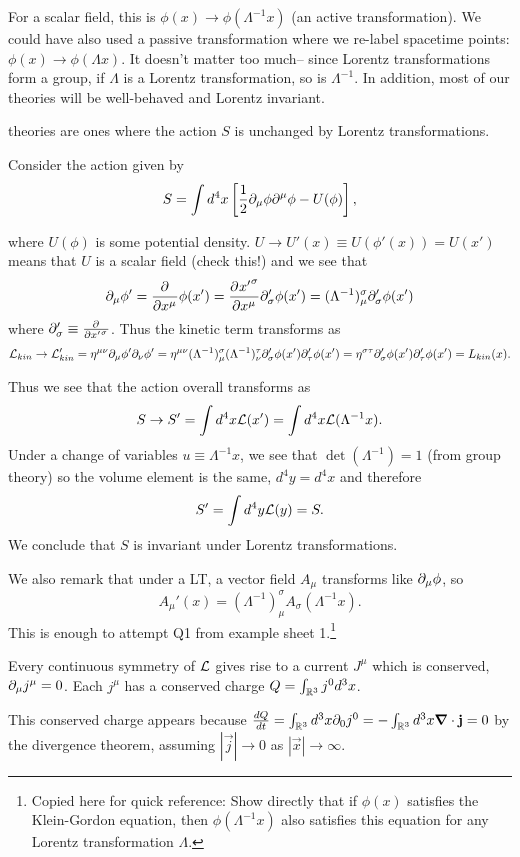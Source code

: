 For a scalar field, this is $\phi(x)\to \phi(\Lambda^{-1}x)$ (an active transformation). We could have also used a passive transformation where we re-label spacetime points: $\phi(x)\to \phi(\Lambda x)$. It doesn't matter too much-- since Lorentz transformations form a group, if $\Lambda$ is a Lorentz transformation, so is $\Lambda^{-1}$. In addition, most of our theories will be well-behaved and Lorentz invariant.

\begin{defn}
 theories are ones where the action $S$ is unchanged by Lorentz transformations.
\end{defn}

\begin{exm}
Consider the action given by
$$S=\int d^4x \left[\frac{1}{2} \partial_\mu \phi \partial^\mu \phi-U(\phi)\right],$$
\end{exm}
where $U(\phi)$ is some potential density. $U\to U'(x) \equiv U(\phi'(x))= U(x')$ means that $U$ is a scalar field (check this!) and we see that
$$\partial_\mu \phi' =\frac{\partial^{} }{\partial {x^\mu} ^{}}\phi(x')=\frac{\partial^{} {{x'}^\sigma}}{\partial {x^\mu} ^{}} \partial_\sigma' \phi(x')= (\Lambda^{-1})^\sigma_\mu \partial_\sigma' \phi(x')$$
where $\partial_\sigma' \equiv \frac{\partial^{} }{\partial {{x'}^\sigma} ^{}}$.
Thus the kinetic term transforms as
$$\mathcal L_{kin} \to \mathcal L_{kin}'=\eta^{\mu\nu}\partial_\mu \phi' \partial_\nu \phi' =\eta^{\mu\nu}(\Lambda^{-1})^\sigma_\mu (\Lambda^{-1})^\tau_\nu \partial_\sigma' \phi(x') \partial_\tau' \phi(x')=\eta^{\sigma\tau} \partial_\sigma' \phi(x')\partial_\tau' \phi(x') = L_{kin}(x).$$

Thus we see that the action overall transforms as
$$S\to S' = \int d^4 x \mathcal L(x')=\int d^4 x \mathcal L(\Lambda^{-1}x).$$
Under a change of variables $u \equiv \Lambda^{-1} x$, we see that $\det(\Lambda^{-1})=1$ (from group theory) so the volume element is the same, $d^4y=d^4x$ and therefore
$$S'=\int d^4 y \mathcal L(y)=S.$$
We conclude that $S$ is invariant under Lorentz transformations.

We also remark that under a LT, a vector field $A_\mu$ transforms like $\partial_\mu \phi$, so $$A_\mu'(x) = (\Lambda^{-1})^\sigma_\mu A_\sigma (\Lambda^{-1}x).$$
This is enough to attempt Q1 from example sheet 1.\footnote{Copied here for quick reference: Show directly that if $\phi(x)$ satisfies the Klein-Gordon equation, then $\phi(\Lambda^{-1} x)$ also satisfies this equation for any Lorentz transformation $\Lambda.$}

\begin{thm}
Every continuous symmetry of $\mathcal L$ gives rise to a current $J^\mu$ which is conserved, $\partial_\mu j^\mu=0$. Each $j^\mu$ has a conserved charge $Q=\int_{\mathbb{R}^3} j^0 d^3x$.

This conserved charge appears because $\frac{dQ}{dt}=\int_{\mathbb{R}^3} d^3x \partial_0 j^0  = -\int_{\mathbb{R}^3} d^3 x \mbox{\boldmath$ \nabla $} \cdot \boldsymbol{\mathbf{j}} =0$ by the divergence theorem, assuming $|\vec{j}|\to 0$ as $|\vec{x}|\to \infty$.
\end{thm}

